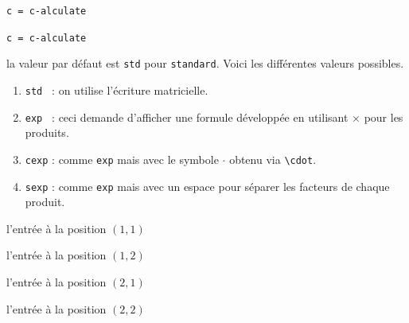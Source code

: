 \documentclass[12pt,a4paper]{book}
\newcommand\env[1]{\texttt{#1}}
\newcommand\macro[1]{\env{\textbackslash{}#1}}
\theoremstyle{definition}
\newcommand\extraspace{
	\vspace{0.25em}
}
\newcommand\mwhyprefix[2]{%
	\texttt{#1 = #1-#2}%
}
\begin{document}
{{ \hfill \mwhyprefix{c}{alculate}

 \hfill \mwhyprefix{c}{alculate}

\IDoption{} la valeur par défaut est \verb+std+ pour \verb+standard+. Voici les différentes valeurs possibles.
\begin{enumerate}
	\item \verb+std + : on utilise l'écriture matricielle.

	\item \verb+exp + : ceci demande d'afficher une formule développée en utilisant $\times$ pour les produits.

	\item \verb+cexp+ : comme \verb+exp+ mais avec le symbole $\cdot$ obtenu via \macro{cdot}.

	\item \verb+sexp+ : comme \verb+exp+ mais avec un espace pour séparer les facteurs de chaque produit.
\end{enumerate}

 l'entrée à la position $(1, 1)$

 l'entrée à la position $(1, 2)$

\extraspace

 l'entrée à la position $(2, 1)$

 l'entrée à la position $(2, 2)$                   








}}
\end{document}
